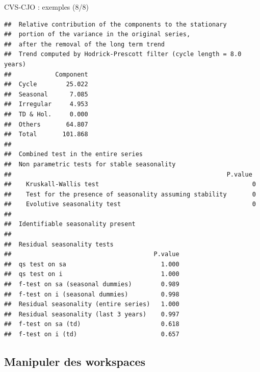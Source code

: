 \documentclass[10pt,xcolor=table,color={dvipsnames,usenames},ignorenonframetext,usepdftitle=false,french]{beamer}
\newenvironment{Shaded}{\begin{snugshade}}{\end{snugshade}}
\newcommand{\NormalTok}[1]{#1}
\newcommand{\OperatorTok}[1]{\textcolor[rgb]{0.81,0.36,0.00}{\textbf{#1}}}
\begin{document}
\begin{frame}[fragile]{CVS-CJO : exemples (8/8)}
\protect\hypertarget{cvs-cjo-exemples-88}{}

\footnotesize

\begin{Shaded}
\end{Shaded}

\begin{verbatim}
##  Relative contribution of the components to the stationary
##  portion of the variance in the original series,
##  after the removal of the long term trend 
##  Trend computed by Hodrick-Prescott filter (cycle length = 8.0 years)
##            Component
##  Cycle        25.022
##  Seasonal      7.085
##  Irregular     4.953
##  TD & Hol.     0.000
##  Others       64.807
##  Total       101.868
## 
##  Combined test in the entire series 
##  Non parametric tests for stable seasonality
##                                                           P.value
##    Kruskall-Wallis test                                          0
##    Test for the presence of seasonality assuming stability       0
##    Evolutive seasonality test                                    0
##  
##  Identifiable seasonality present
## 
##  Residual seasonality tests 
##                                       P.value
##  qs test on sa                          1.000
##  qs test on i                           1.000
##  f-test on sa (seasonal dummies)        0.989
##  f-test on i (seasonal dummies)         0.998
##  Residual seasonality (entire series)   1.000
##  Residual seasonality (last 3 years)    0.997
##  f-test on sa (td)                      0.618
##  f-test on i (td)                       0.657
\end{verbatim}

\end{frame}

\hypertarget{manipuler-des-workspaces}{%
\subsection{Manipuler des workspaces}\label{manipuler-des-workspaces}}
\end{document}

